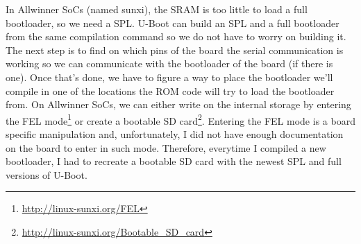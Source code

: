 In Allwinner SoCs (named sunxi), the SRAM is too little to load a full bootloader, so we need a SPL. U-Boot can build an SPL and a full bootloader from the same compilation command so we do not have to worry on building it. The next step is to find on which pins of the board the serial communication is working so we can communicate with the bootloader of the board (if there is one). Once that's done, we have to figure a way to place the bootloader we'll compile in one of the locations the ROM code will try to load the bootloader from. On Allwinner SoCs, we can either write on the internal storage by entering the FEL mode\footnote{\url{http://linux-sunxi.org/FEL}} or create a bootable SD card\footnote{\url{http://linux-sunxi.org/Bootable\_SD\_card}}. Entering the FEL mode is a board specific manipulation and, unfortunately, I did not have enough documentation on the board to enter in such mode. Therefore, everytime I compiled a new bootloader, I had to recreate a bootable SD card with the newest SPL and full versions of U-Boot.

